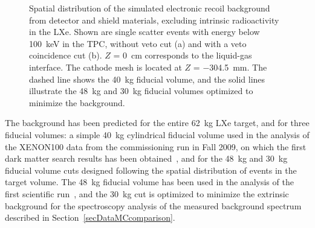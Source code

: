 \begin{figure}[!b]
\caption[Spatial distribution of the simulated electronic recoil background from detector and shield materials]{Spatial distribution of the simulated electronic recoil background from detector and shield materials, excluding intrinsic radioactivity in the LXe. Shown are single scatter events with energy below 100~keV in the TPC, without veto cut (a) and with a veto coincidence cut (b). $Z$ = 0~cm corresponds to the liquid-gas interface. The cathode mesh is located at $Z$ = $-$304.5~mm. The dashed line shows the 40~kg fiducial volume, and the solid lines illustrate the 48~kg and 30~kg fiducial volumes optimized to minimize the background.}
\label{figPositionDistribution}
\end{figure}

The background has been predicted for the entire 62~kg LXe target, and for three fiducial volumes: a simple 40~kg cylindrical fiducial volume used in the analysis of the XENON100 data from the commissioning run in Fall 2009, on which the first dark matter search results has been obtained~\cite{xe100-run07}, and for the 48~kg and 30~kg fiducial volume cuts designed following the spatial distribution of events in the target volume. The 48~kg fiducial volume has been used in the analysis of the first scientific run~\cite{xe100-run08}, and the 30~kg cut is optimized to minimize the extrinsic background for the spectroscopy analysis of the measured background spectrum described in Section~\ref{secDataMCcomparison}. 

